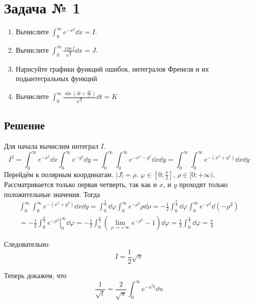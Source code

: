 \section{Задача № 1}

\begin{enumerate}
\item Вычислите \(\int_{0}^{\infty} e^{-x^2} \dd x = I\).
\item Вычислите \(\int_{0}^{\infty} \frac{\cos t}{\sqrt{t}} \dd x = J\).
\item Нарисуйте графики функций ошибок, интегралов Френеля
  и их подынтегральных функций
\item Вычислите
  \(\int_{0}^{\infty} \frac{\sin(3t + \frac{3\pi}{2})}{\sqrt{t}} \dd t = K\)
\end{enumerate}

\subsection{Решение}

Для начала вычислим интеграл \(I\).
\[
  I^2 = \int_{0}^{\infty} e^{-x^2} \dd x \int_{0}^{\infty} e^{-y^2} \dd y
  = \int_{0}^{\infty} \int_{0}^{\infty} e^{-x^2-y^2} \dd x \dd y
  = \int_{0}^{\infty} \int_{0}^{\infty} e^{-(x^2+y^2)} \dd x \dd y
\]
Перейдём к полярным координатам. \(|J| = \rho\).
\(\varphi \in [0; \frac{\pi}{2}]\), \(\rho \in [0;+\infty)\).
Рассматривается только первая четверть, так как и \(x\), и \(y\)
проходят только положительные значения.
Тогда
\[
\begin{split}
  \int_{0}^{\infty} \int_{0}^{\infty} e^{-(x^2+y^2)} \dd x \dd y
  = \int_{0}^{\frac{\pi}{2}} \dd \varphi \int_{0}^{\infty} e^{-\rho^2} \rho \dd \rho
  = -\frac{1}{2} \int_{0}^{\frac{\pi}{2}} \dd \varphi \int_{0}^{\infty} e^{-\rho^2} \dd(-\rho^2) \\
  = -\frac{1}{2} \int_{0}^{\frac{\pi}{2}} \left. e^{-\rho^2}\right\rvert_{0}^{\infty}\dd \varphi
  = -\frac{1}{2} \int_{0}^{\frac{\pi}{2}}
    \left( \lim_{\rho \to +\infty} e^{-\rho^2} - 1 \right) \dd \varphi
  = \frac{1}{2} \int_{0}^{\frac{\pi}{2}} \dd \varphi
  = \frac{\pi}{4}
\end{split}
\]

Следовательно:
\[ I = \frac{1}{2}\sqrt{\pi} \]

Теперь докажем, что
\begin{equation}\label{eq:01-sqrtt}
  \frac{1}{\sqrt{t}} = \frac{2}{\sqrt{\pi}} \int_{0}^{\infty} e^{-u^2 t} \dd u
\end{equation}

